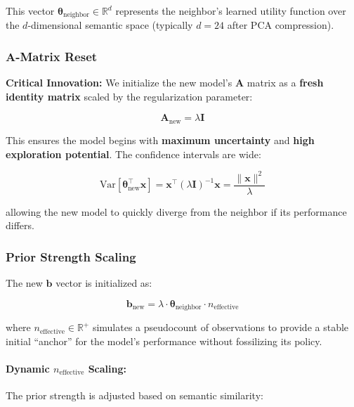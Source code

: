 \documentclass[sigconf]{acmart}
\begin{document}
This vector $\boldsymbol{\theta}_{\text{neighbor}} \in \mathbb{R}^d$ represents the neighbor's learned utility function over the $d$-dimensional semantic space (typically $d=24$ after PCA compression).

\subsubsection{A-Matrix Reset}

\textbf{Critical Innovation:} We initialize the new model's $\mathbf{A}$ matrix as a \textbf{fresh identity matrix} scaled by the regularization parameter:

\begin{equation}
\mathbf{A}_{\text{new}} = \lambda \mathbf{I}
\label{eq:A_reset}
\end{equation}

This ensures the model begins with \textbf{maximum uncertainty} and \textbf{high exploration potential}. The confidence intervals are wide:

\begin{equation}
\text{Var}[\boldsymbol{\theta}_{\text{new}}^\top \mathbf{x}] = \mathbf{x}^\top (\lambda \mathbf{I})^{-1} \mathbf{x} = \frac{\|\mathbf{x}\|^2}{\lambda}
\end{equation}

allowing the new model to quickly diverge from the neighbor if its performance differs.

\subsubsection{Prior Strength Scaling}

The new $\mathbf{b}$ vector is initialized as:

\begin{equation}
\mathbf{b}_{\text{new}} = \lambda \cdot \boldsymbol{\theta}_{\text{neighbor}} \cdot n_{\text{effective}}
\label{eq:b_initialization}
\end{equation}

where $n_{\text{effective}} \in \mathbb{R}^+$ simulates a pseudocount of observations to provide a stable initial ``anchor'' for the model's performance without fossilizing its policy.

\paragraph{Dynamic $n_{\text{effective}}$ Scaling:}
The prior strength is adjusted based on semantic similarity:
\end{document}
